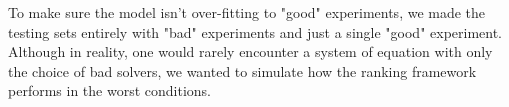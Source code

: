 To make sure the model isn't over-fitting to "good" experiments, we made the testing sets entirely with "bad" experiments and just a single "good" experiment. Although in reality, one would rarely encounter a system of equation with only the choice of bad solvers, we wanted to simulate how the ranking framework performs in the worst conditions. 













